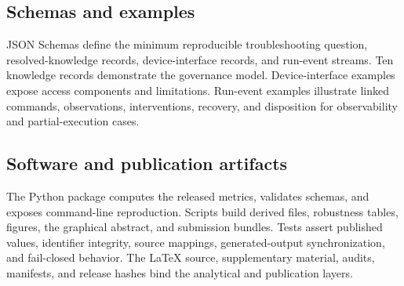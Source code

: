 \subsection{Schemas and examples}

JSON Schemas define the minimum reproducible troubleshooting question, resolved-knowledge records, device-interface records, and run-event streams. Ten knowledge records demonstrate the governance model. Device-interface examples expose access components and limitations. Run-event examples illustrate linked commands, observations, interventions, recovery, and disposition for observability and partial-execution cases.

\subsection{Software and publication artifacts}

The Python package computes the released metrics, validates schemas, and exposes command-line reproduction. Scripts build derived files, robustness tables, figures, the graphical abstract, and submission bundles. Tests assert published values, identifier integrity, source mappings, generated-output synchronization, and fail-closed behavior. The LaTeX source, supplementary material, audits, manifests, and release hashes bind the analytical and publication layers.

